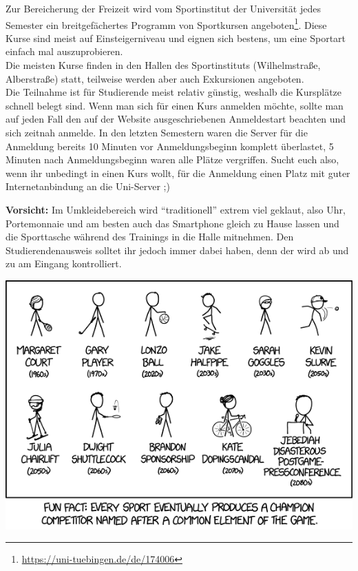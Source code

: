 Zur Bereicherung der Freizeit wird vom Sportinstitut der Universität jedes
Semester ein breitgefächertes Programm von Sportkursen
angeboten\footnote{\url{https://uni-tuebingen.de/de/174006}}. Diese Kurse sind
meist auf Einsteigerniveau und eignen sich bestens, um eine Sportart einfach
mal auszuprobieren.\\
Die meisten Kurse finden in den Hallen des Sportinstituts (Wilhelmstraße,
Alberstraße) statt, teilweise werden aber auch Exkursionen angeboten.\\
Die Teilnahme ist für Studierende meist relativ günstig, weshalb die Kursplätze
schnell belegt sind. Wenn man sich für einen Kurs anmelden möchte, sollte man
auf jeden Fall den auf der Website ausgeschriebenen Anmeldestart beachten und
sich zeitnah anmelde. In den letzten Semestern waren die Server für die
Anmeldung bereits 10 Minuten vor Anmeldungsbeginn komplett überlastet, 5
Minuten nach Anmeldungsbeginn waren alle Plätze vergriffen. Sucht euch also,
wenn ihr unbedingt in einen Kurs wollt, für die Anmeldung einen Platz mit guter
Internetanbindung an die Uni-Server ;)

\textbf{Vorsicht:} Im Umkleidebereich wird "`traditionell"' extrem viel
  geklaut, also Uhr, Portemonnaie und am besten auch das Smartphone gleich
  zu Hause lassen und die Sporttasche wäh\-rend des Trainings in
  die Halle mitnehmen. Den Studierendenausweis solltet ihr jedoch immer dabei haben, 
  denn der wird ab und zu am Eingang kontrolliert.
 
\vfill

\begin{center}
\includegraphics[width=0.8\hsize]{shared/xkcd/sports_champions.png}
\end{center}
